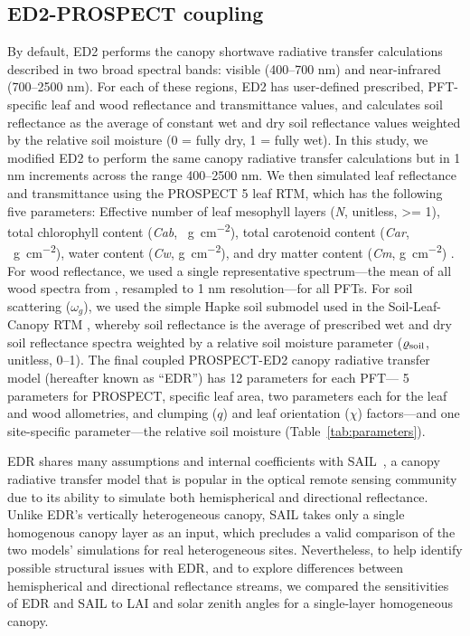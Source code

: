 \subsection{ED2-PROSPECT coupling}\label{subsec:edr-prospect}

By default, ED2 performs the canopy shortwave radiative transfer calculations described in two broad spectral bands:
visible (400--700 \unit{nm}) and near-infrared (700--2500 \unit{nm}).
For each of these regions, ED2 has user-defined prescribed, PFT-specific leaf and wood reflectance and transmittance values, and calculates soil reflectance as the average of constant wet and dry soil reflectance values weighted by the relative soil moisture (0 = fully dry, 1 = fully wet).
In this study, we modified ED2 to perform the same canopy radiative transfer calculations but in 1 \unit{nm} increments across the range 400--2500 \unit{nm}.
We then simulated leaf reflectance and transmittance using the PROSPECT 5 leaf RTM,
which has the following five parameters:
Effective number of leaf mesophyll layers (\emph{N}, unitless, >= 1),
total chlorophyll content (\emph{Cab}, \unit{\mu g ~ cm^{-2}}),
total carotenoid content (\emph{Car}, \unit{\mu g ~ cm^{-2}}),
water content (\emph{Cw}, \unit{g ~ cm^{-2}}),
and dry matter content (\emph{Cm}, \unit{g ~ cm^{-2}})
\citep{feret2008prospect4}.
For wood reflectance, we used a single representative spectrum---the mean of all wood spectra from \citet{asner1998biophysical}, resampled to 1 \unit{nm} resolution---for all PFTs.
For soil scattering ($\omega_{g}$), we used the simple Hapke soil submodel used in the Soil-Leaf-Canopy RTM \citep{verhoef2007coupled}, whereby soil reflectance is the average of prescribed wet and dry soil reflectance spectra weighted by a relative soil moisture parameter ($\varrho_{\mathrm{soil}}$, unitless, 0--1).
The final coupled PROSPECT-ED2 canopy radiative transfer model (hereafter known as ``EDR'') has 12 parameters for each PFT---
5 parameters for PROSPECT, specific leaf area, two parameters each for the leaf and wood allometries, and clumping ($q$) and leaf orientation ($\chi$) factors---and one site-specific parameter---the relative soil moisture (Table~\ref{tab:parameters}).

EDR shares many assumptions and internal coefficients with SAIL~\citep{verhoef1984light, verhoef2007coupled}, a canopy radiative transfer model that is popular in the optical remote sensing community due to its ability to simulate both hemispherical and directional reflectance.
Unlike EDR's vertically heterogeneous canopy, SAIL takes only a single homogenous canopy layer as an input, which precludes a valid comparison of the two models' simulations for real heterogeneous sites.
Nevertheless, to help identify possible structural issues with EDR, and to explore differences between hemispherical and directional reflectance streams, we compared the sensitivities of EDR and SAIL to LAI and solar zenith angles for a single-layer homogeneous canopy.

